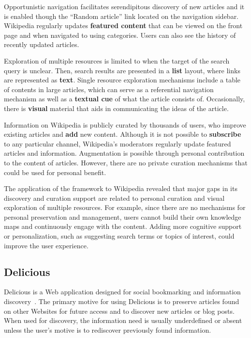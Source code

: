 \documentclass{sigchi}
\begin{document}
{{Opportunistic navigation facilitates serendipitous discovery of new articles and it is enabled though the ``Random article'' link located on the navigation sidebar. Wikipedia regularly updates \textbf{featured content} that can be viewed on the front page and when navigated to using categories. Users can also see the history of recently updated articles. 

Exploration of multiple resources is limited to when the target of the search query is unclear. Then, search results are presented in a \textbf{list} layout, where links are represented as \textbf{text}. Single resource exploration mechanisms include a table of contents in large articles, which can serve as a referential navigation mechanism as well as a \textbf{textual cue} of what the article consists of. Occasionally, there is \textbf{visual} material that aids in communicating the ideas of the article.  

Information on Wikipedia is publicly curated by thousands of users, who improve existing articles and \textbf{add} new content. Although it is not possible to \textbf{subscribe} to any particular channel, Wikipedia's moderators regularly update featured articles and information. Augmentation is possible through personal contribution to the content of articles. However, there are no private curation mechanisms that could be used for personal benefit. 

The application of the framework to Wikipedia revealed that major gaps in its discovery and curation support are related to personal curation and visual exploration of multiple resources. For example, since there are no mechanisms for personal preservation and management, users cannot build their own knowledge maps and continuously engage with the content. Adding more cognitive support or personalization, such as suggesting search terms or topics of interest, could improve the user experience.

} %


{\subsection{Delicious}
Delicious is a Web application designed for social bookmarking and information discovery~\cite{rader2008influences, tesconi2008semantify}. The primary motive for using Delicious is to preserve articles found on other Websites for future access and to discover new articles or blog posts. When used for discovery, the information need is usually underdefined or absent unless the user's motive is to rediscover previously found information.   

}}
\end{document}
